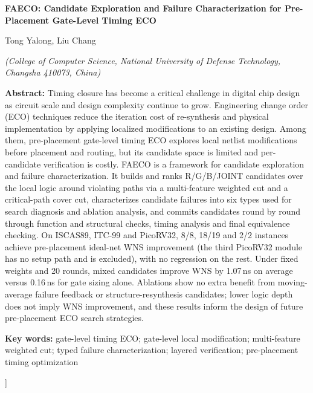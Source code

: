 \documentclass[twocolumn,10pt,fontset=windows]{ctexart}
\begin{document}
\vspace{2pt}
\begin{center}
{\bfseries\fontsize{12.5}{16}\selectfont FAECO: Candidate Exploration and Failure Characterization for Pre-Placement Gate-Level Timing ECO}\par
\vspace{3pt}
{\normalsize Tong Yalong, Liu Chang\par}
\vspace{3pt}
{\small \itshape (College of Computer Science, National University of Defense Technology, Changsha 410073, China)}\par
\vspace{4pt}
\end{center}
\begin{flushleft}
  {\bfseries Abstract:} {\small Timing closure has become a critical challenge in digital chip design as circuit scale and design complexity continue to grow. Engineering change order (ECO) techniques reduce the iteration cost of re-synthesis and physical implementation by applying localized modifications to an existing design. Among them, pre-placement gate-level timing ECO explores local netlist modifications before placement and routing, but its candidate space is limited and per-candidate verification is costly. FAECO is a framework for candidate exploration and failure characterization. It builds and ranks R/G/B/JOINT candidates over the local logic around violating paths via a multi-feature weighted cut and a critical-path cover cut, characterizes candidate failures into six types used for search diagnosis and ablation analysis, and commits candidates round by round through function and structural checks, timing analysis and final equivalence checking. On ISCAS89, ITC-99 and PicoRV32, 8/8, 18/19 and 2/2 instances achieve pre-placement ideal-net WNS improvement (the third PicoRV32 module has no setup path and is excluded), with no regression on the rest. Under fixed weights and 20 rounds, mixed candidates improve WNS by 1.07\,ns on average versus 0.16\,ns for gate sizing alone. Ablations show no extra benefit from moving-average failure feedback or structure-resynthesis candidates; lower logic depth does not imply WNS improvement, and these results inform the design of future pre-placement ECO search strategies.}\par
\vspace{3pt}
{\bfseries Key words:} {\small gate-level timing ECO; gate-level local modification; multi-feature weighted cut; typed failure characterization; layered verification; pre-placement timing optimization}\par
\end{flushleft}
]%
\end{document}
